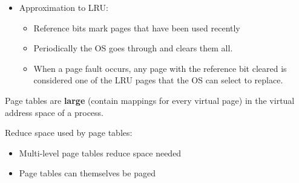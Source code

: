 \begin{frame}[fragile]

\begin{itemize}
\item Approximation to LRU:
\begin{itemize}
    \item Reference bits mark pages that have been used recently
    \item Periodically the OS goes through and clears them all. \item When a page fault occurs, any
page with the reference bit cleared is considered one of the LRU pages that the OS can select to replace.
\end{itemize}
\end{itemize}

\begin{tcolorbox}[enhanced,attach boxed title to top center={yshift=-3mm,yshifttext=-1mm},
  colback=blue!5!white,colframe=blue!75!black,colbacktitle=blue!80!black,
  title=Think About It,fonttitle=\bfseries,
  boxed title style={size=small,colframe=red!50!black} ]

Page tables are \textbf{large} (contain mappings for every virtual page) in the virtual address space of a process.
  \end{tcolorbox}
Reduce space used by page tables:
  \begin{itemize}
\item Multi-level page tables reduce space needed 
\item Page tables can themselves be paged
\end{itemize}


\end{frame}
